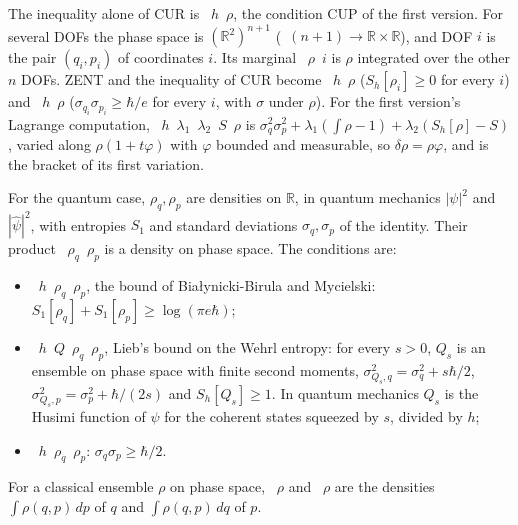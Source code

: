 \documentclass[11pt]{article}
\begin{document}
The inequality alone of CUR is ~$h$~$\rho$, the condition CUP of the
first version. For several DOFs the phase space is $(\mathbb R^2)^{n+1}$
(~$(n + 1) \to \mathbb R \times \mathbb R$), and DOF $i$ is the pair $(q_i, p_i)$ of
coordinates $i$. Its marginal ~$\rho$~$i$ is $\rho$ integrated over the other
$n$ DOFs. ZENT and the inequality of CUR become ~$h$~$\rho$
($S_h[\rho_i] \ge 0$ for every $i$) and ~$h$~$\rho$
($\sigma_{q_i}\sigma_{p_i} \ge \hbar/e$ for every $i$, with $\sigma$ under $\rho$). For the
first version's Lagrange computation, ~$h$~$\lambda_1$~$\lambda_2$~$S$~$\rho$ is
$\sigma_q^2\sigma_p^2 + \lambda_1(\int\rho - 1) + \lambda_2(S_h[\rho] - S)$, varied along
$\rho(1 + t\varphi)$ with $\varphi$ bounded and measurable, so $\delta\rho = \rho\varphi$, and
 is the bracket of its first variation.

For the quantum case, $\rho_q, \rho_p$ are densities on $\mathbb R$, in quantum mechanics
$|\psi|^2$ and $|\hat\psi|^2$, with entropies $S_1$ and standard deviations $\sigma_q, \sigma_p$
of the identity. Their product ~$\rho_q$~$\rho_p$ is a density on phase space.
The conditions are:
\begin{itemize}
\item {}~$h$~$\rho_q$~$\rho_p$, the bound of
  Bia\l{}ynicki-Birula and Mycielski: $S_1[\rho_q] + S_1[\rho_p] \ge \log(\pi e\hbar)$;
\item {}~$h$~$Q$~$\rho_q$~$\rho_p$, Lieb's bound on the Wehrl entropy: for every
  $s > 0$, $Q_s$ is an ensemble on phase space with finite second moments,
  $\sigma^2_{Q_s,q} = \sigma_q^2 + s\hbar/2$, $\sigma^2_{Q_s,p} = \sigma_p^2 + \hbar/(2s)$ and
  $S_h[Q_s] \ge 1$. In quantum mechanics $Q_s$ is the Husimi function of $\psi$ for the coherent
  states squeezed by $s$, divided by $h$;
\item {}~$h$~$\rho_q$~$\rho_p$: $\sigma_q\sigma_p \ge \hbar/2$.
\end{itemize}
For a classical ensemble $\rho$ on phase space, ~$\rho$ and
~$\rho$ are the densities $\int\rho(q, p)\,dp$ of $q$ and $\int\rho(q, p)\,dq$
of $p$.
\end{document}
